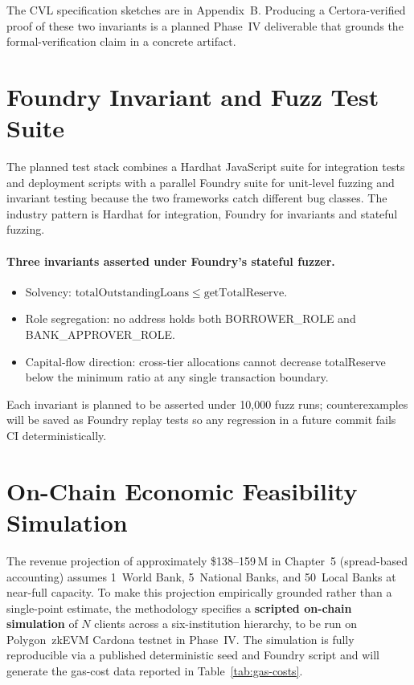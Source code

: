 \documentclass[12pt,a4paper]{report}
\begin{document}
The CVL specification sketches are in Appendix~B. Producing a Certora-verified proof of these two invariants is a planned Phase~IV deliverable that grounds the formal-verification claim in a concrete artifact.

\section{Foundry Invariant and Fuzz Test Suite}
\label{sec:foundry}

The planned test stack combines a Hardhat JavaScript suite for integration tests and deployment scripts with a parallel Foundry suite for unit-level fuzzing and invariant testing because the two frameworks catch different bug classes. The industry pattern is Hardhat for integration, Foundry for invariants and stateful fuzzing.

\paragraph{Three invariants asserted under Foundry's stateful fuzzer.}
\begin{itemize}[noitemsep]
\item Solvency: \(\mathrm{totalOutstandingLoans} \le \mathrm{getTotalReserve}\).
\item Role segregation: no address holds both BORROWER\_ROLE and BANK\_APPROVER\_ROLE.
\item Capital-flow direction: cross-tier allocations cannot decrease totalReserve below the minimum ratio at any single transaction boundary.
\end{itemize}

Each invariant is planned to be asserted under 10{,}000 fuzz runs; counterexamples will be saved as Foundry replay tests so any regression in a future commit fails CI deterministically.

\section{On-Chain Economic Feasibility Simulation}
\label{sec:abm-sim}

The revenue projection of approximately \$138--159\,M in Chapter~5 (spread-based accounting) assumes 1~World Bank, 5~National Banks, and 50~Local Banks at near-full capacity. To make this projection empirically grounded rather than a single-point estimate, the methodology specifies a \textbf{scripted on-chain simulation} of $N$ clients across a six-institution hierarchy, to be run on Polygon~zkEVM Cardona testnet in Phase~IV. The simulation is fully reproducible via a published deterministic seed and Foundry script and will generate the gas-cost data reported in Table~\ref{tab:gas-costs}.
\end{document}
